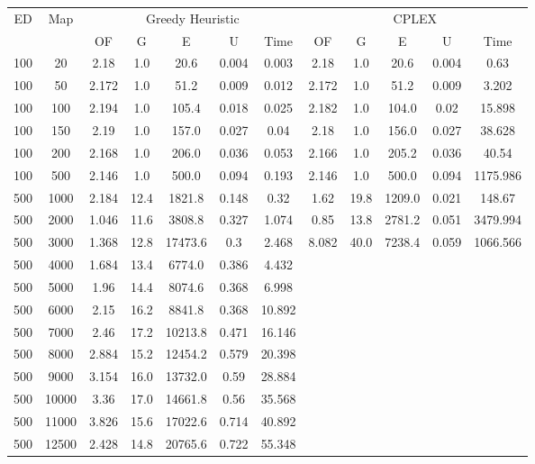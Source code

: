 \begin{table}[htb]
	\centering
	\begin{tabular}{|c|c|c|c|c|c|c|c|c|c|c|c|}
		\hline
		\multirow{2}{*}{ED} & \multirow{2}{*}{Map} & \multicolumn{5}{c|}{Greedy Heuristic} & \multicolumn{5}{c|}{CPLEX}\\ 
		\cline{3-12}
&& OF & G & E & U & Time & OF & G & E & U & Time\\ 
		\hline
		100 & 20 & 2.18 & 1.0 & 20.6 & 0.004 & 0.003 & 2.18 & 1.0 & 20.6 & 0.004 & 0.63 \\ 
		100 & 50 & 2.172 & 1.0 & 51.2 & 0.009 & 0.012 & 2.172 & 1.0 & 51.2 & 0.009 & 3.202 \\ 
		100 & 100 & 2.194 & 1.0 & 105.4 & 0.018 & 0.025 & 2.182 & 1.0 & 104.0 & 0.02 & 15.898 \\ 
		100 & 150 & 2.19 & 1.0 & 157.0 & 0.027 & 0.04 & 2.18 & 1.0 & 156.0 & 0.027 & 38.628 \\ 
		100 & 200 & 2.168 & 1.0 & 206.0 & 0.036 & 0.053 & 2.166 & 1.0 & 205.2 & 0.036 & 40.54 \\ 
		100 & 500 & 2.146 & 1.0 & 500.0 & 0.094 & 0.193 & 2.146 & 1.0 & 500.0 & 0.094 & 1175.986 \\ 
		500 & 1000 & 2.184 & 12.4 & 1821.8 & 0.148 & 0.32 & 1.62 & 19.8 & 1209.0 & 0.021 & 148.67 \\ 
		500 & 2000 & 1.046 & 11.6 & 3808.8 & 0.327 & 1.074 & 0.85 & 13.8 & 2781.2 & 0.051 & 3479.994 \\ 
		500 & 3000 & 1.368 & 12.8 & 17473.6 & 0.3 & 2.468 & 8.082 & 40.0 & 7238.4 & 0.059 & 1066.566 \\ 
		500 & 4000 & 1.684 & 13.4 & 6774.0 & 0.386 & 4.432 & & & & &  \\ 
		500 & 5000 & 1.96 & 14.4 & 8074.6 & 0.368 & 6.998 & & & & &  \\ 
		500 & 6000 & 2.15 & 16.2 & 8841.8 & 0.368 & 10.892 & & & & &  \\ 
		500 & 7000 & 2.46 & 17.2 & 10213.8 & 0.471 & 16.146 & & & & &  \\ 
		500 & 8000 & 2.884 & 15.2 & 12454.2 & 0.579 & 20.398 & & & & &  \\ 
		500 & 9000 & 3.154 & 16.0 & 13732.0 & 0.59 & 28.884 & & & & &  \\ 
		500 & 10000 & 3.36 & 17.0 & 14661.8 & 0.56 & 35.568 & & & & &  \\ 
		500 & 11000 & 3.826 & 15.6 & 17022.6 & 0.714 & 40.892 & & & & &  \\ 
		500 & 12500 & 2.428 & 14.8 & 20765.6 & 0.722 & 55.348 & & & & &  \\ 

\end{tabular}
\end{table}

